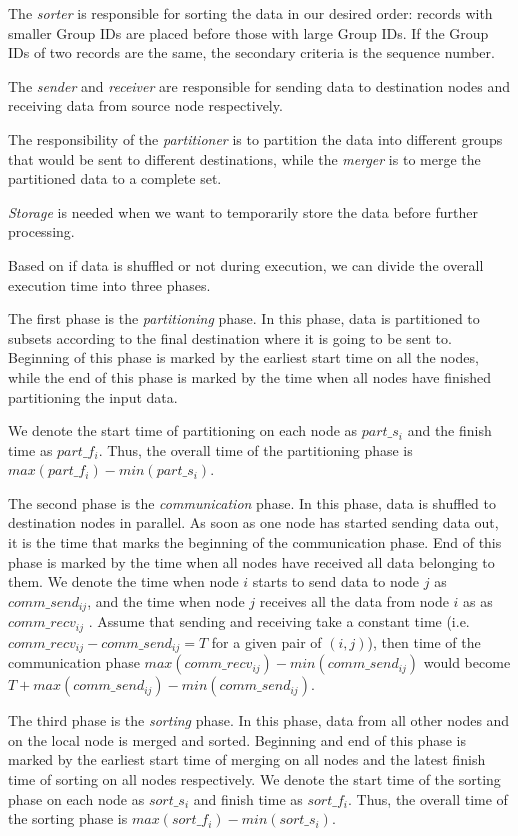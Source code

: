 \documentclass{article}
\begin{document}
The \textit{sorter} is responsible for sorting the data in our desired order: records with smaller Group IDs are placed before those with large Group IDs.
If the Group IDs of two records are the same, the secondary criteria is the sequence number.

The \textit{sender} and \textit{receiver} are responsible for sending data to destination nodes and receiving data from source node respectively.

The responsibility of the \textit{partitioner} is to partition the data into different groups that would be sent to different destinations,
while the \textit{merger} is to merge the partitioned data to a complete set.

\textit{Storage} is needed when we want to temporarily store the data before further processing.

Based on if data is shuffled or not during execution, we can divide the overall execution time into three phases.

The first phase is the \textit{partitioning} phase.
In this phase, data is partitioned to subsets according to the final destination where it is going to be sent to.
Beginning of this phase is marked by the earliest start time on all the nodes,
while the end of this phase is marked by the time when all nodes have finished partitioning the input data.

We denote the start time of partitioning on each node as $part\_s_i$ and the finish time as $part\_f_i$.
Thus, the overall time of the partitioning phase is $max(part\_f_i) - min(part\_s_i)$.

The second phase is the \textit{communication} phase.
In this phase, data is shuffled to destination nodes in parallel.
As soon as one node has started sending data out, it is the time that marks the beginning of the communication phase.
End of this phase is marked by the time when all nodes have received all data belonging to them.
We denote the time when node $i$ starts to send data to node $j$ as $comm\_send_{ij}$,
and the time when node $j$ receives all the data from node $i$ as as $comm\_recv_{ij}$ .
Assume that sending and receiving take a constant time (i.e. $comm\_recv_{ij} - comm\_send_{ij} = T$ for a given pair of $(i, j)$), 
then time of the communication phase $max(comm\_recv_{ij}) - min(comm\_send_{ij})$ would become $T + max(comm\_send_{ij}) - min(comm\_send_{ij})$.

The third phase is the \textit{sorting} phase.
In this phase, data from all other nodes and on the local node is merged and sorted.
Beginning and end of this phase is marked by the earliest start time of merging on all nodes and the latest finish time of sorting on all nodes respectively.
We denote the start time of the sorting phase on each node as $sort\_s_i$ and finish time as $sort\_f_i$.
Thus, the overall time of the sorting phase is $max(sort\_f_i) - min(sort\_s_i)$.
\end{document}
